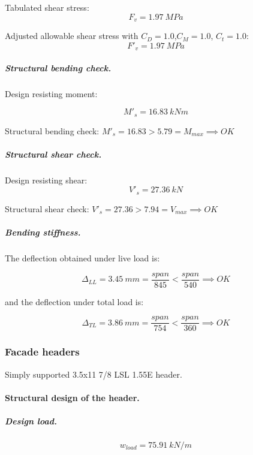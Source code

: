 \noindent Tabulated shear stress:
\begin{equation}
  F_v= 1.97\ MPa
\end{equation}

\noindent Adjusted allowable shear stress with $C_D= 1.0$,$C_M= 1.0$, $C_t= 1.0$:
\begin{equation}
  F'_v= 1.97\ MPa
\end{equation}

\subparagraph{Structural bending check.}

\noindent Design resisting moment:

\begin{equation}
  M'_s= 16.83\ kN m
\end{equation}

\noindent Structural bending check: $M'_s = 16.83 > 5.79 = M_{max} \implies OK$

\subparagraph{Structural shear check.}

\noindent Design resisting shear:
\begin{equation}
  V'_s= 27.36\ kN
\end{equation}

\noindent Structural shear check: $V'_s = 27.36 > 7.94 = V_{max} \implies OK$

\subparagraph{Bending stiffness.}
The deflection obtained under live load is:

\begin{equation}
  \Delta_{LL}= 3.45\ mm= \frac{span}{845} < \frac{span}{540} \implies OK
\end{equation}

\noindent and the deflection under total load is:

\begin{equation}
  \Delta_{TL}= 3.86\ mm= \frac{span}{754} < \frac{span}{360} \implies OK
\end{equation}

\subsubsection{Facade headers}
Simply supported 3.5x11 7/8 LSL 1.55E header.

\paragraph{Structural design of the header.}

\subparagraph{Design load.}

\begin{equation}
  w_{load}= 75.91\ kN/m
\end{equation}

